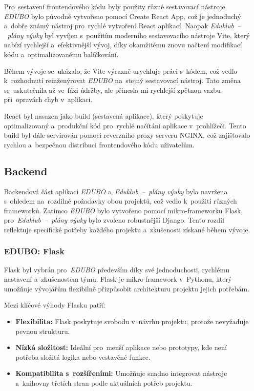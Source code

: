 \documentclass[male,czech,api_bc]{kitheses}
\begin{document}
Pro~sestavení frontendového kódu byly použity různé sestavovací nástroje. \textit{EDUBO} bylo původně vytvořeno pomocí Create React App, což je jednoduchý a~dobře známý nástroj pro~rychlé vytvoření React aplikací. Naopak \textit{Eduklub~--~plány výuky} byl vyvíjen s~použitím moderního sestavovacího nástroje Vite, který nabízí rychlejší a~efektivnější vývoj, díky okamžitému znovu načtení modifikací kódu a~optimalizovanému balíčkování.

Během vývoje se~ukázalo, že Vite výrazně urychluje práci s~kódem, což vedlo k~rozhodnutí reinženýrovat \textit{EDUBO} na~stejný sestavovací nástroj. Tato změna se~uskutečnila až ve~fázi údržby, ale přinesla mi rychlejší zpětnou vazbu při~opravách chyb v~aplikaci.

React byl nasazen jako build (sestavená aplikace), který poskytuje optimalizovaný a~produkční kód pro~rychlé načítání aplikace v~prohlížeči. Tento build byl dále servírován pomocí reverzního proxy serveru NGINX, což zajišťovalo rychlou a~bezpečnou distribuci frontendového kódu uživatelům.

\subsection{Backend}

Backendová část aplikací \textit{EDUBO} a~\textit{Eduklub~--~plány výuky} byla navržena s~ohledem na~rozdílné požadavky obou projektů, což vedlo k~použití různých frameworků. Zatímco \textit{EDUBO} bylo vytvořeno pomocí mikro-frameworku Flask, pro~\textit{Eduklub~--~plány výuky} bylo zvoleno robustnější Django. Tento rozdíl reflektuje specifické potřeby každého projektu a~zkušenosti získané během vývoje.

\subsubsection{EDUBO: Flask}

Flask byl vybrán pro~\textit{EDUBO} především díky své jednoduchosti, rychlému nastavení a~zkušenostem týmu. Flask je mikro-framework v~Pythonu, který umožňuje vývojářům flexibilně přizpůsobit architekturu projektu jejich potřebám.

Mezi klíčové výhody Flasku patří:
\begin{itemize}
	\item \textbf{Flexibilita:} Flask poskytuje svobodu v~návrhu projektu, protože nevyžaduje pevnou strukturu.
	\item \textbf{Nízká složitost:} Ideální pro~menší aplikace nebo prototypy, kde není potřeba složitá logika nebo vestavěné funkce.
	\item \textbf{Kompatibilita s~rozšířeními:} Umožňuje snadno integrovat nástroje a~knihovny třetích stran podle aktuálních potřeb projektu.
\end{itemize}
\end{document}
